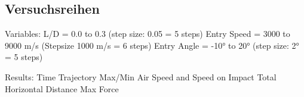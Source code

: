 \subsection{Versuchsreihen}
Variables:
L/D = 0.0 to 0.3 (step size: 0.05 = 5 steps)
Entry Speed = 3000 to 9000 m/s \cite{Edquist2009} (Stepsize 1000 m/s = 6 steps)
Entry Angle = -10° to 20° (step size: 2° = 5 steps)

Results:
Time
Trajectory
Max/Min Air Speed and Speed on Impact
Total Horizontal Distance
Max Force